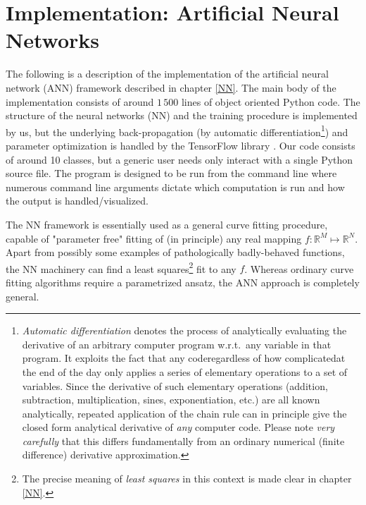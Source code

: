 \documentclass[../../master.tex]{subfiles}
\begin{document}
\chapter{Implementation: Artificial Neural Networks \label{NNimplementation}}
The following is a description of the implementation of the artificial neural network (ANN) framework described in chapter \ref{NN}. The main body of the implementation consists of around $1\,500$ lines of object oriented Python code. The structure of the neural networks (NN) and the training procedure is implemented by us, but the underlying back-propagation (by automatic differentiation\footnote{\emph{Automatic differentiation} denotes the process of analytically evaluating the derivative of an arbitrary computer program w.r.t.\ any variable in that program. It exploits the fact that any code\textemdash regardless of how complicated\textemdash at the end of the day only applies a series of elementary operations to a set of variables. Since the derivative of such elementary operations (addition, subtraction, multiplication, sines, exponentiation, etc.) are all known analytically, repeated application of the chain rule can in principle give the closed form analytical derivative of \emph{any} computer code. Please note \emph{very carefully} that this differs fundamentally from an ordinary numerical (finite difference) derivative approximation.}) and parameter optimization is handled by the TensorFlow library \cite{tensorflow}. Our code consists of around 10 classes, but a generic user needs only interact with a single Python source file. The program is designed to be run from the command line where numerous command line arguments dictate which computation is run and how the output is handled/visualized.

The NN framework is essentially used as a general curve fitting procedure, capable of "parameter free" fitting of (in principle) any real mapping $f:\mathbb{R}^M\mapsto \mathbb{R}^N$. Apart from possibly some examples of pathologically badly-behaved functions, the NN machinery can find a least squares\footnote{The precise meaning of \emph{least squares} in this context is made clear in chapter \ref{NN}.} fit to any $f$. Whereas ordinary curve fitting algorithms require a parametrized ansatz, the ANN approach is completely general. 
\end{document}
